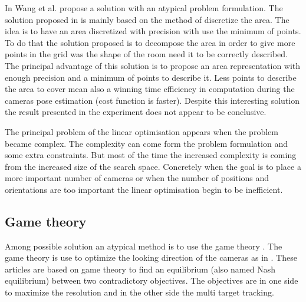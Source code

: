 In Wang et al. \cite{181*wang2017} propose a solution with an atypical problem formulation. The solution proposed in \cite{181*wang2017} is mainly based on the method of discretize the area. The idea is to have an area discretized with precision with use the minimum of points. To do that the solution proposed is to decompose the area in order to give more points in the grid was the shape of the room need it to be correctly described. \\
The principal advantage of this solution is to propose an area representation with enough precision and a minimum of points to describe it. Less points to describe the area to cover mean also a winning time efficiency in computation during the cameras pose estimation (cost function is faster).
Despite this interesting solution the result presented in the experiment does not appear to be conclusive.  

The principal problem of the linear optimisation appears when the problem became complex. The complexity can come form the  problem formulation and some extra constraints. But most of the time the increased complexity is coming from the increased size of the search space. Concretely when the goal is to place a more important number of cameras or when the number of positions and orientations are too important the linear optimisation begin to be inefficient. 
	
\subsection{Game theory} 
	 
Among possible solution an atypical method is to use the game theory \cite{19*li2013}. The game theory is use to optimize the looking direction of the cameras as in \cite{12*soto2009,18*ding2012,19*li2013,25*song2008}. These articles are based on game theory to find an equilibrium (also named Nash equilibrium) between two contradictory objectives. The objectives are in one side to maximize the resolution and  in the other side the multi target tracking.

